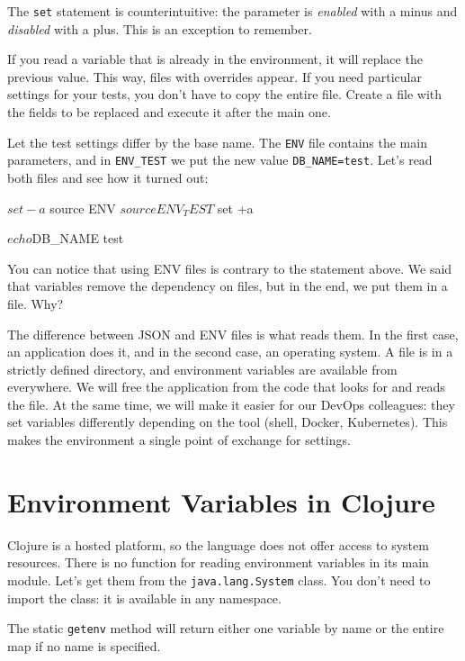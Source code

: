 The \verb|set| statement is counterintuitive: the parameter is \emph{enabled} with a minus and \emph{disabled} with a plus. This is an exception to remember.

If you read a variable that is already in the environment, it will replace the previous value. This way, files with overrides appear. If you need particular settings for your tests, you don't have to copy the entire file. Create a file with the fields to be replaced and execute it after the main one.

Let the test settings differ by the base name. The \verb|ENV| file contains the main parameters, and in \verb|ENV_TEST| we put the new value \verb|DB_NAME=test|. Let's read both files and see how it turned out:

\begin{bash}
$ set -a
$ source ENV
$ source ENV_TEST
$ set +a

$ echo $DB_NAME
test
\end{bash}

You can notice that using ENV files is contrary to the statement above. We said that variables remove the dependency on files, but in the end, we put them in a file. Why?


The difference between JSON and ENV files is what reads them. In the first case, an application does it, and in the second case, an operating system. A file is in a strictly defined directory, and environment variables are available from everywhere. We will free the application from the code that looks for and reads the file. At the same time, we will make it easier for our DevOps colleagues: they set variables differently depending on the tool (shell, Docker, Kubernetes). This makes the environment a single point of exchange for settings.

\section{ Environment Variables in Clojure}


Clojure is a hosted platform, so the language does not offer access to system resources. There is no function for reading environment variables in its main module. Let's get them from the \verb|java.lang.System| class. You don't need to import the class: it is available in any namespace.

The static \verb|getenv| method will return either one variable by name or the entire map if no name is specified.

